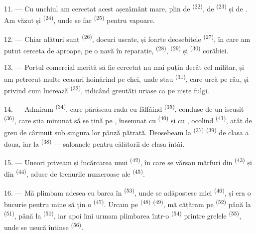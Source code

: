 11. --- Cu unchiul am cercetat acest așezământ mare, plin de 
\textsuperscript{(22)}, de  \textsuperscript{(23)} și de
. Am văzut și  \textsuperscript{(24)}, unde
se fac  \textsuperscript{(25)} pentru vapoare.

12. --- Chiar alături sunt  \textsuperscript{(26)}, docuri uscate,
și foarte deosebitele  \textsuperscript{(27)}, în care am
putut cerceta de aproape, pe o navă în reparație, 
\textsuperscript{(28)},  \textsuperscript{(29)} și 
\textsuperscript{(30)} corăbiei.

13. --- Portul comercial merită să fie cercetat nu mai puțin decât cel militar, și
am petrecut multe ceasuri hoinărind pe chei, unde stau 
\textsuperscript{(31)}, care urcă pe râu, și privind cum lucrează  \textsuperscript{(32)}, ridicând greutăți uriașe ca pe niște fulgi.

\VUsaut{4.0mm}
\VUsaut{3.0mm}

14. --- Admiram  \textsuperscript{(34)}, care părăseau
rada cu  fâlfâind \textsuperscript{(35)}, conduse de un
 iscusit \textsuperscript{(36)}, care știa minunat să se țină pe
, însemnat cu  \textsuperscript{(40)} și cu
, ocolind  \textsuperscript{(41)}, atât de greu de
cârmuit sub singura lor pânză pătrată. Deosebeam la 
\textsuperscript{(37)}  \textsuperscript{(39)} de clasa a doua,
iar la  \textsuperscript{(38)} --- saloanele pentru călătorii de clasa
întâi.

15. --- Uneori priveam și încărcarea unui 
\textsuperscript{(42)}, în care se vărsau mărfuri din 
\textsuperscript{(43)} și din  \textsuperscript{(44)}, aduse
de trenurile numeroase ale  \textsuperscript{(45)}.

\VUsaut{3.0mm}
\VUsaut{3.0mm}

16. --- Mă plimbam adesea cu barca în 
\textsuperscript{(53)}, unde se adăpostesc  mici
\textsuperscript{(46)}, și era o bucurie pentru mine să țin o 
\textsuperscript{(47)}. Urcam pe  \textsuperscript{(48)}
 \textsuperscript{(49)}, mă cățăram pe
 \textsuperscript{(52)} până la 
\textsuperscript{(51)}, până la  \textsuperscript{(50)}, iar apoi
îmi urmam plimbarea într-o  \textsuperscript{(54)} printre grelele
 \textsuperscript{(55)}, unde se usucă 
întinse \textsuperscript{(56)}.

